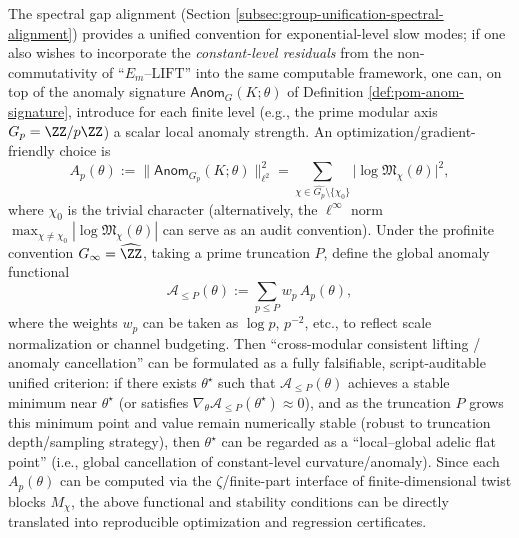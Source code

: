 \begin{remark}\label{rem:pom-adelic-anom-functional}
The spectral gap alignment (Section \ref{subsec:group-unification-spectral-alignment}) provides a unified convention for exponential-level slow modes;
if one also wishes to incorporate the \emph{constant-level residuals} from the non-commutativity of ``\(E_m\)--\(\mathrm{LIFT}\)'' into the same computable framework,
one can, on top of the anomaly signature \(\mathsf{Anom}_G(K;\theta)\) of Definition \ref{def:pom-anom-signature}, introduce for each finite level (e.g., the prime modular axis \(G_p=\ZZ/p\ZZ\)) a scalar local anomaly strength.
An optimization/gradient-friendly choice is
\[
A_p(\theta):=\bigl\|\mathsf{Anom}_{G_p}(K;\theta)\bigr\|_{\ell^2}^2
=\sum_{\chi\in\widehat{G_p}\setminus\{\chi_0\}}\bigl|\log\mathfrak{M}_\chi(\theta)\bigr|^2,
\]
where \(\chi_0\) is the trivial character (alternatively, the \(\ell^\infty\) norm \(\max_{\chi\ne\chi_0}|\log\mathfrak{M}_\chi(\theta)|\) can serve as an audit convention).
Under the profinite convention \(G_\infty=\widehat{\ZZ}\), taking a prime truncation \(P\), define the global anomaly functional
\[
\mathcal{A}_{\le P}(\theta):=\sum_{p\le P} w_p\,A_p(\theta),
\]
where the weights \(w_p\) can be taken as \(\log p\), \(p^{-2}\), etc., to reflect scale normalization or channel budgeting.
Then ``cross-modular consistent lifting / anomaly cancellation'' can be formulated as a fully falsifiable, script-auditable unified criterion:
if there exists \(\theta^\star\) such that \(\mathcal{A}_{\le P}(\theta)\) achieves a stable minimum near \(\theta^\star\) (or satisfies \(\nabla_\theta\mathcal{A}_{\le P}(\theta^\star)\approx 0\)),
and as the truncation \(P\) grows this minimum point and value remain numerically stable (robust to truncation depth/sampling strategy),
then \(\theta^\star\) can be regarded as a ``local--global adelic flat point'' (i.e., global cancellation of constant-level curvature/anomaly).
Since each \(A_p(\theta)\) can be computed via the \(\zeta\)/finite-part interface of finite-dimensional twist blocks \(M_\chi\), the above functional and stability conditions can be directly translated into reproducible optimization and regression certificates.
\end{remark}

